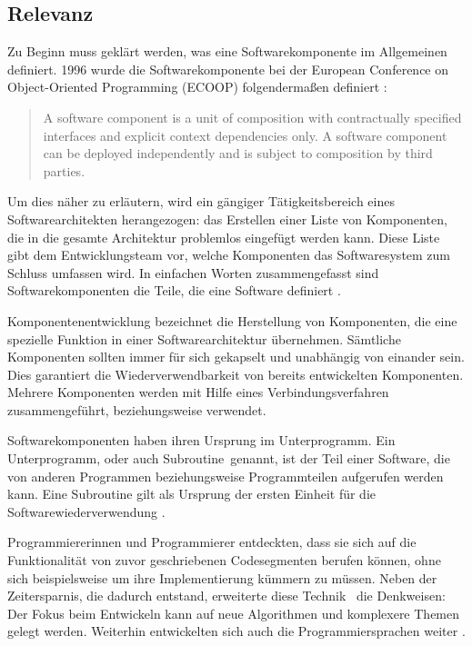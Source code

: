 \subsection{Relevanz}
\label{sec:1_Relevanz}

Zu Beginn muss geklärt werden, was eine Softwarekomponente im Allgemeinen definiert. 1996 wurde die Softwarekomponente bei der European Conference on Object-Oriented Programming (ECOOP) folgendermaßen definiert \citereset \autocite[siehe][S. 35-47]{Szyperski.2002}:
\begin{quote}
\glqq A software component is a unit of composition with contractually specified interfaces and explicit context dependencies only. A software component can be deployed independently and is subject to composition by third parties.\grqq
\end{quote}
Um dies näher zu erläutern, wird ein gängiger Tätigkeitsbereich eines Softwarearchitekten herangezogen: das Erstellen einer Liste von Komponenten, die in die gesamte Architektur problemlos eingefügt werden kann. Diese Liste gibt dem Entwicklungsteam vor, welche Komponenten das Softwaresystem zum Schluss umfassen wird. In einfachen Worten zusammengefasst sind Softwarekomponenten die Teile, die eine Software definiert \citereset \autocite[siehe][S. 35-47]{Szyperski.2002}.

Komponentenentwicklung bezeichnet die Herstellung von Komponenten, die eine spezielle Funktion in einer Softwarearchitektur übernehmen. Sämtliche Komponenten sollten immer für sich gekapselt und unabhängig von einander sein. Dies garantiert die Wiederverwendbarkeit von bereits entwickelten Komponenten. Mehrere Komponenten werden mit Hilfe eines Verbindungsverfahren zusammengeführt, beziehungsweise verwendet.

Softwarekomponenten haben ihren Ursprung im \glqq Unterprogramm\grqq . Ein \glqq Unterprogramm\grqq , oder auch \glqq Subroutine\grqq\ genannt, ist der Teil einer Software, die von anderen Programmen beziehungsweise Programmteilen aufgerufen werden kann. Eine Subroutine gilt als Ursprung der ersten Einheit für die Softwarewiederverwendung \citereset \autocite[siehe][]{Wheeler.1985}.

Programmiererinnen und Programmierer entdeckten, dass sie sich auf die Funktionalität von zuvor geschriebenen Codesegmenten berufen können, ohne sich beispielsweise um ihre Implementierung kümmern zu müssen. Neben der Zeitersparnis, die dadurch entstand, erweiterte diese \glqq Technik \grqq\ die Denkweisen: Der Fokus beim Entwickeln kann auf neue Algorithmen und komplexere Themen gelegt werden. Weiterhin entwickelten sich auch die Programmiersprachen weiter \citereset \autocite[siehe][S. 3-12]{Szyperski.2002}.

